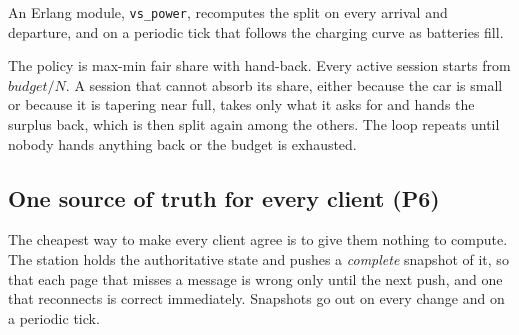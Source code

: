 An Erlang module, \texttt{vs\_power}, recomputes the split on every arrival and departure, and on a
periodic tick that follows the charging curve as batteries fill.

The policy is max-min fair share with hand-back. Every active session starts from
$budget/N$. A session that cannot absorb its share, either because the car is
small or because it is tapering near full, takes only what it asks for and hands
the surplus back, which is then split again among the others. The loop repeats
until nobody hands anything back or the budget is exhausted.


\subsection{One source of truth for every client (P6)}
\label{sec:p6}

The cheapest way to make every client agree is to give them nothing to compute.
The station holds the authoritative state and pushes a \emph{complete} snapshot of
it, so that each page that misses a
message is wrong only until the next push, and one that reconnects is correct
immediately. Snapshots go out on every change and on a periodic tick.

